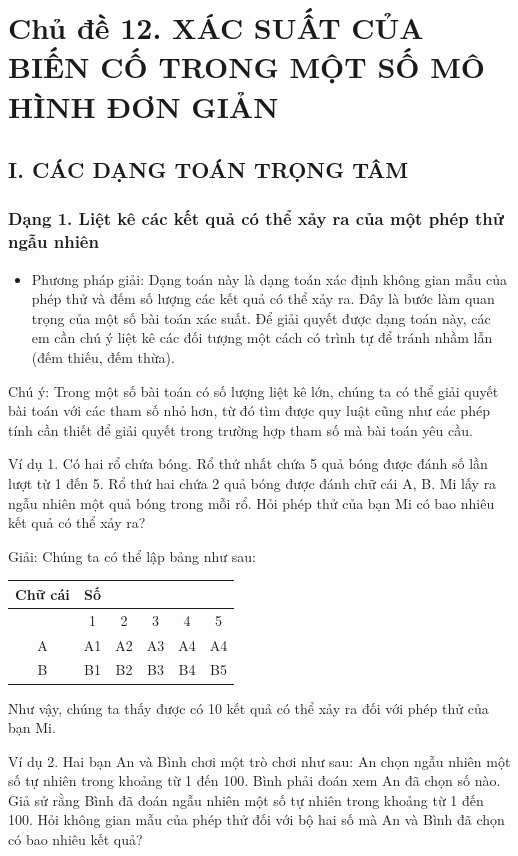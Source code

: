 \documentclass[%
    fontsize=12pt,%
    chapterprefix=false,%
    open=right,%
    twoside=false,%
    numbers=noenddot,%
    headings=optiontohead,%
    final,%
    DIV=15,%
    parskip=half %
]{scrbook}
\begin{document}
\section{Chủ đề 12. XÁC SUẤT CỦA BIẾN CỐ TRONG MỘT SỐ MÔ HÌNH ĐƠN GIẢN}
\subsection{I. CÁC DẠNG TOÁN TRỌNG TÂM}
\subsubsection{Dạng 1. Liệt kê các kết quả có thể xảy ra của một phép thử ngẫu nhiên}

\begin{itemize}
  \item Phương pháp giải: Dạng toán này là dạng toán xác định không gian mẫu của phép thử và đếm số lượng các kết quả có thể xảy ra. Đây là bước làm quan trọng của một số bài toán xác suất. Để giải quyết được dạng toán này, các em cần chú ý liệt kê các đối tượng một cách có trình tự để tránh nhầm lẫn (đếm thiếu, đếm thừa).
\end{itemize}

Chú ý: Trong một số bài toán có số lượng liệt kê lớn, chúng ta có thể giải quyết bài toán với các tham số nhỏ hơn, từ đó tìm được quy luật cũng như các phép tính cần thiết để giải quyết trong trường hợp tham số mà bài toán yêu cầu.

Ví dụ 1. Có hai rổ chứa bóng. Rổ thứ nhất chứa 5 quả bóng được đánh số lần lượt từ 1 đến 5. Rổ thứ hai chứa 2 quả bóng được đánh chữ cái A, B. Mi lấy ra ngẫu nhiên một quả bóng trong mỗi rổ. Hỏi phép thử của bạn Mi có bao nhiêu kết quả có thể xảy ra?

Giải: Chúng ta có thể lập bảng như sau:

\begin{tabular}{|c|c|c|c|c|c|} \hline Chữ cái & Số &  &  &  &  \\ \hline  & 1 & 2 & 3 & 4 & 5 \\ \hline A & A1 & A2 & A3 & A4 & A4 \\ \hline B & B1 & B2 & B3 & B4 & B5 \\ \hline \end{tabular}

Như vậy, chúng ta thấy được có 10 kết quả có thể xảy ra đối với phép thử của bạn Mi.

Ví dụ 2. Hai bạn An và Bình chơi một trò chơi như sau: An chọn ngẫu nhiên một số tự nhiên trong khoảng từ 1 đến 100. Bình phải đoán xem An đã chọn số nào. Giả sử rằng Bình đã đoán ngẫu nhiên một số tự nhiên trong khoảng từ 1 đến 100. Hỏi không gian mẫu của phép thử đối với bộ hai số mà An và Bình đã chọn có bao nhiêu kết quả?
\end{document}
